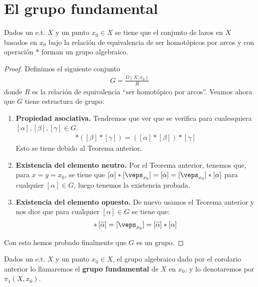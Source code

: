 \section{El grupo fundamental}
\begin{coro}
    Dados un e.t. $X$ y un punto $x_0\in X$ se tiene que el conjunto de lazos en $X$ basados en $x_0$ bajo la relación de equivalencia de ser homotópicos por arcos y con operación $\ast$ forman un grupo algebraico.

    \begin{proof}
        Definimos el siguiente conjunto
        \begin{gather*}
            G = \frac{\Omega(X;x_0)}{R}
        \end{gather*}
        donde $R$ es la relación de equivalencia ``ser homotópico por arcos''. Veamos ahora que $G$ tiene estructura de grupo:
        \begin{enumerate}
            \item \textbf{Propiedad asociativa.} Tendremos que ver que se verifica para cualesquiera $[\alpha],[\beta], [\gamma]\in G$.
            \begin{gather*}
                [\alpha] \ast ([\beta] \ast [\gamma]) = ([\alpha] \ast [\beta]) \ast [\gamma]
            \end{gather*}
            Esto se tiene debido al Teorema anterior.

            \item \textbf{Existencia del elemento neutro.} Por el Teorema anterior, tenemos que, para $x=y=x_0$, se tiene que $[\alpha] \ast [\veps_{x_0}] = [\alpha] = [\veps_{x_0}] \ast [\alpha]$ para cualquier $[\alpha]\in G$, luego tenemos la existencia probada.
            \item \textbf{Existencia del elemento opuesto.} De nuevo usamos el Teorema anterior y nos dice que para cualquier $[\alpha]\in G$ se tiene que: 
            \begin{gather*}
                [\alpha] \ast \left[\tilde{\alpha}\right] = [\veps_{x_0}] =  \left[\tilde{\alpha}\right] \ast [\alpha] 
            \end{gather*}
        \end{enumerate}
        Con esto hemos probado finalmente que $G$ es un grupo.
    \end{proof}
\end{coro}

\begin{definicion}
    Dados un e.t. $X$ y un punto $x_0\in X$, el grupo algebraico dado por el corolario anterior lo llamaremos el \textbf{grupo fundamental} de $X$ en $x_0$, y lo denotaremos por $\pi_1(X,x_0)$.
\end{definicion}

